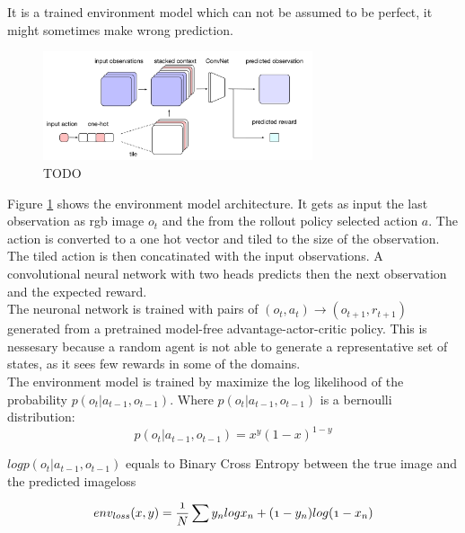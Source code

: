 It is a trained environment model which can not be assumed to be perfect, it might sometimes make wrong prediction.\\

   
\begin{figure}[H] 
  \centering 
   
  \includegraphics[width=300px]{./Images/environment_model_architecture.png}
  \caption{TODO} 
  \label{fig:environment_model_architecture} 
\end{figure} 

Figure \ref{fig:environment_model_architecture} shows the environment model architecture. It gets as input the last observation as rgb image $o_t$ and the from the rollout policy selected action $a$. The action is converted to a one hot vector and tiled to the size of the observation. The tiled action is then concatinated with the input observations. A convolutional neural network with two heads predicts then the next observation and the expected reward.\\

The neuronal network is trained with pairs of $(o_t, a_t) \rightarrow (o_{t+1}, r_{t+1})$ generated from a pretrained model-free advantage-actor-critic policy. This is nessesary because a random agent is not able to generate a representative set of states, as it sees few rewards in some of the domains.\\

 
The environment model is trained by maximize the log likelihood of the probability $p(o_t | a_{t-1}, o_{t-1})$. Where $p(o_t | a_{t-1}, o_{t-1})$ is a bernoulli distribution: 
\begin{equation} 
   p(o_t | a_{t-1}, o_{t-1}) = x^y (1-x)^{1-y} 
\end{equation} 
   
$log p(o_t | a_{t-1}, o_{t-1})$ equals to Binary Cross Entropy between the true image and the predicted imageloss 
   
\begin{equation} 
  \mathnormal{ 
  env_{loss}(x, y) = \frac{1}{N} \sum y_n log x_n + (1-y_n) log(1- x_n) 
  } 
  \end{equation} 
 
